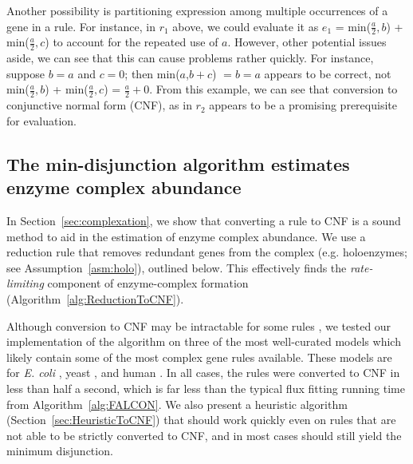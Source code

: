 Another possibility is partitioning expression among multiple occurrences
of a gene in a rule. For instance, in $r_1$ above, we could evaluate
it as $e_1$ =
min($\frac{a}{2},b$) + min($\frac{a}{2},c$) to account for the
repeated use of $a$. However, other potential issues aside, we can see
that this can cause problems rather quickly. For instance, suppose $b
= a$ and $c = 0$; then min($a$,$b+c$) $=b=a$ appears to be correct,
not min($\frac{a}{2},b$) + min($\frac{a}{2},c$) = $\frac{a}{2} + 0$.
From this example, we can see that conversion to conjunctive normal
form (CNF), as in $r_2$ appears to be a promising prerequisite for evaluation.

\subsection{The min-disjunction algorithm estimates enzyme complex abundance}%

In \suppOrApp Section~\ref{sec:complexation}, we show that
converting a rule to CNF is a sound method
to aid in the estimation of enzyme complex abundance. We use a
reduction rule that removes redundant genes from the complex
(e.g. holoenzymes; see \suppOrApp Assumption~\ref{asm:holo}), outlined
below. This effectively finds the \emph{rate-limiting} component of
enzyme-complex formation (\suppOrApp Algorithm~\ref{alg:ReductionToCNF}).

Although conversion to CNF may be intractable for some rules
\citep{Russell2009}, we tested our implementation of the algorithm on
three of the most well-curated models which likely contain some of the
most complex gene rules available. These models are for \textit{E. coli}
\citep{Orth2011}, yeast \citep{Aung2013}, and human
\citep{Thiele2013}. In all cases, the rules were converted to CNF in
less than half a second, which is far less than the typical flux
fitting running time from \suppOrApp Algorithm~\ref{alg:FALCON}. We also present
a heuristic algorithm (Section~\ref{sec:HeuristicToCNF}) that should
work quickly even on rules that are not able to be strictly converted
to CNF, and in most cases should still yield the minimum disjunction.

